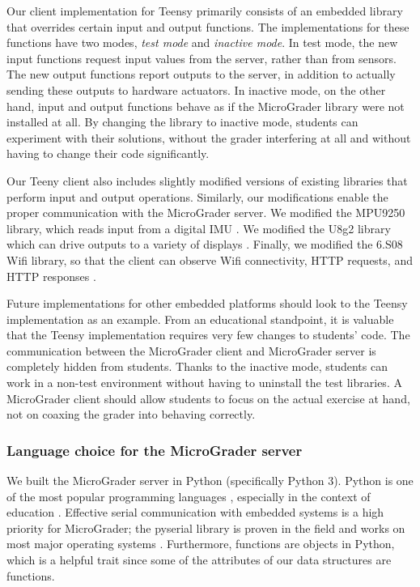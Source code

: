 \documentclass[12pt]{article}
\begin{document}
Our client implementation for Teensy primarily consists of an embedded library that overrides certain input and output functions.  The implementations for these functions have two modes, \textit{test mode} and \textit{inactive mode}.  In test mode, the new input functions request input values from the server, rather than from sensors.  The new output functions report outputs to the server, in addition to actually sending these outputs to hardware actuators.  In inactive mode, on the other hand, input and output functions behave as if the MicroGrader library were not installed at all.  By changing the library to inactive mode, students can experiment with their solutions, without the grader interfering at all and without having to change their code significantly. 

Our Teeny client also includes slightly modified versions of existing libraries that perform input and output operations.  Similarly, our modifications enable the proper communication with the MicroGrader server.  We modified the MPU9250 library, which reads input from a digital IMU \cite{MPU9250}.  We modified the U8g2 library which can drive outputs to a variety of displays \cite{u8g2}.  Finally, we modified the 6.S08 Wifi library, so that the client can observe Wifi connectivity, HTTP requests, and HTTP responses \cite{6s08-wifi}.

Future implementations for other embedded platforms should look to the Teensy implementation as an example.  From an educational standpoint, it is valuable that the Teensy implementation requires very few changes to students' code.  The communication between the MicroGrader client and MicroGrader server is completely hidden from students.  Thanks to the inactive mode, students can work in a non-test environment without having to uninstall the test libraries.  A MicroGrader client should allow students to focus on the actual exercise at hand, not on coaxing the grader into behaving correctly.

\subsubsection{Language choice for the MicroGrader server}
We built the MicroGrader server in Python (specifically Python 3).  Python is one of the most popular programming languages \cite{python-popular}, especially in the context of education \cite{python-ed}.  Effective serial communication with embedded systems is a high priority for MicroGrader; the pyserial library is proven in the field and works on most major operating systems \cite{pyserial}. Furthermore, functions are objects in Python, which is a helpful trait since some of the attributes of our data structures are functions.  
\end{document}
